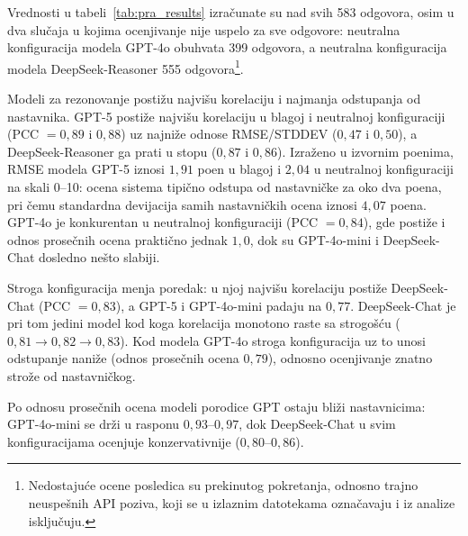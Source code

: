 Vrednosti u tabeli~\ref{tab:pra_results} izračunate su nad svih 583 odgovora,
osim u dva slučaja u kojima ocenjivanje nije uspelo za sve odgovore: neutralna konfiguracija modela GPT-4o obuhvata 399 odgovora,
a neutralna konfiguracija modela DeepSeek-Reasoner 555 odgovora\footnote{Nedostajuće ocene posledica su prekinutog pokretanja,
odnosno trajno neuspešnih API poziva, koji se u izlaznim datotekama označavaju i iz analize isključuju.}.

Modeli za rezonovanje postižu najvišu korelaciju i najmanja odstupanja od nastavnika.
GPT-5 postiže najvišu korelaciju u blagoj i neutralnoj konfiguraciji (PCC $=0{,}89$ i $0{,}88$) uz najniže odnose RMSE/STDDEV ($0{,}47$ i $0{,}50$),
a DeepSeek-Reasoner ga prati u stopu ($0{,}87$ i $0{,}86$).
Izraženo u izvornim poenima, RMSE modela GPT-5 iznosi $1{,}91$ poen u blagoj i $2{,}04$ u neutralnoj konfiguraciji na skali 0--10:
ocena sistema tipično odstupa od nastavničke za oko dva poena,
pri čemu standardna devijacija samih nastavničkih ocena iznosi $4{,}07$ poena.
GPT-4o je konkurentan u neutralnoj konfiguraciji (PCC $=0{,}84$), gde postiže i odnos prosečnih ocena praktično jednak $1{,}0$,
dok su GPT-4o-mini i DeepSeek-Chat dosledno nešto slabiji.

Stroga konfiguracija menja poredak: u njoj najvišu korelaciju postiže DeepSeek-Chat (PCC $=0{,}83$), a GPT-5 i GPT-4o-mini padaju na $0{,}77$.
DeepSeek-Chat je pri tom jedini model kod koga korelacija monotono raste sa strogošću ($0{,}81 \rightarrow 0{,}82 \rightarrow 0{,}83$).
Kod modela GPT-4o stroga konfiguracija uz to unosi odstupanje naniže (odnos prosečnih ocena $0{,}79$),
odnosno ocenjivanje znatno strože od nastavničkog.

Po odnosu prosečnih ocena modeli porodice GPT ostaju bliži nastavnicima: GPT-4o-mini se drži u rasponu $0{,}93$--$0{,}97$,
dok DeepSeek-Chat u svim konfiguracijama ocenjuje konzervativnije ($0{,}80$--$0{,}86$).

